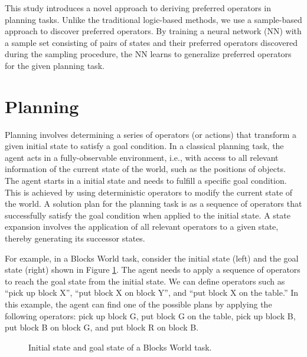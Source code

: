 \documentclass[ppgc,diss,english]{iiufrgs}
\begin{document}
This study introduces a novel approach to deriving preferred operators in planning tasks. Unlike the traditional logic-based methods, we use a sample-based approach to discover preferred operators. By training a neural network (NN) with a sample set consisting of pairs of states and their preferred operators discovered during the sampling procedure, the NN learns to generalize preferred operators for the given planning task.


\section{Planning}
\label{sec:intro-planning}
Planning involves determining a series of operators (or actions) that transform a given initial state to satisfy a goal condition.
In a classical planning task, the agent acts in a fully-observable environment, i.e., with access to all relevant information of the current state of the world, such as the positions of objects. The agent starts in a initial state and needs to fulfill a specific goal condition. This is achieved by using deterministic operators to modify the current state of the world. A solution plan for the planning task is as a sequence of operators that successfully satisfy the goal condition when applied to the initial state. A state expansion involves the application of all relevant operators to a given state, thereby generating its successor states.

For example, in a Blocks World task, consider the initial state (left) and the goal state (right) shown in Figure \ref{fig:intro-blocks}. The agent needs to apply a sequence of operators to reach the goal state from the initial state. We can define operators such as ``pick up block X'', ``put block X on block Y'', and ``put block X on the table.'' In this example, the agent can find one of the possible plans by applying the following operators: pick up block G, put block G on the table, pick up block B, put block B on block G, and put block R on block B. %

\begin{figure}[ht]
\caption[Initial state of a Blocks World task]{Initial state and goal state of a Blocks World task.}
\vspace{\baselineskip}
\centering
{}
\label{fig:intro-blocks}
\end{figure}
\end{document}

